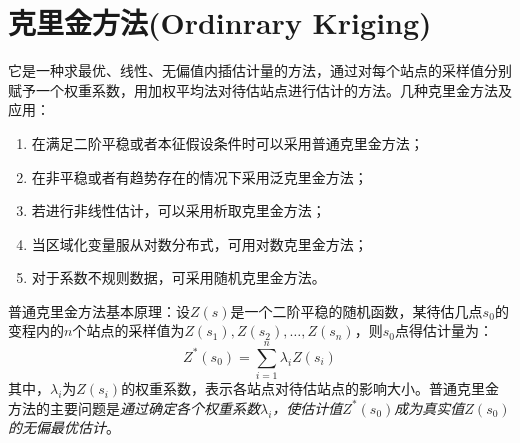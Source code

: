 \section{克里金方法(Ordinrary Kriging)}
它是一种求最优、线性、无偏值内插估计量的方法，通过对每个站点的采样值分别赋予一个权重系数，用加权平均法对待估站点进行估计的方法。几种克里金方法及应用：
\begin{enumerate}
    \item 在满足二阶平稳或者本征假设条件时可以采用\textcolor[rgb]{1,0,0}{普通克里金方法}；
    \item 在非平稳或者有趋势存在的情况下采用\textcolor[rgb]{1,0,0}{泛克里金方法}；
    \item 若进行非线性估计，可以采用\textcolor[rgb]{1,0,0}{析取克里金方法}；
    \item 当区域化变量服从对数分布式，可用\textcolor[rgb]{1,0,0}{对数克里金方法}；
    \item 对于系数不规则数据，可采用\textcolor[rgb]{1,0,0}{随机克里金方法}。
\end{enumerate}

普通克里金方法基本原理：设$Z(s)$是一个二阶平稳的随机函数，某待估几点$s_0$的变程内的$n$个站点的采样值为$Z(s_1),Z(s_2),\dots,Z(s_n)$，则$s_0$点得估计量为：
\begin{equation}
    Z^*(s_0) = \sum\limits_{i=1}^{n}\lambda_iZ(s_i)
    \label{eq-kriging}
\end{equation}
其中，$\lambda_i$为$Z(s_i)$的权重系数，表示各站点对待估站点的影响大小。普通克里金方法的主要问题是\emph{\textcolor[rgb]{1,0,0}{通过确定各个权重系数$\lambda_i$，使估计值$Z^*(s_0)$成为真实值$Z(s_0)$的无偏最优估计}}。

